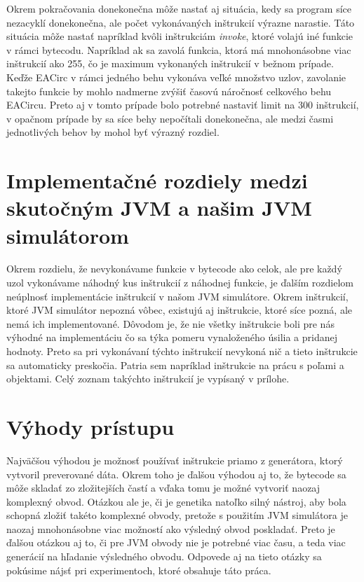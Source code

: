 Okrem pokračovania donekonečna môže nastať aj situácia, kedy sa program síce nezacyklí donekonečna, ale počet vykonávaných inštrukcií výrazne narastie. Táto situácia môže nastať napríklad kvôli inštrukciám \textit{invoke}, ktoré volajú iné funkcie v rámci bytecodu. Napríklad ak sa zavolá funkcia, ktorá má mnohonásobne viac inštrukcií ako 255, čo je maximum vykonaných inštrukcií v bežnom prípade. Keďže EACirc v rámci jedného behu vykonáva veľké množstvo uzlov, zavolanie takejto funkcie by mohlo nadmerne zvýšiť časovú náročnosť celkového behu EACircu. Preto aj v tomto prípade bolo potrebné nastaviť limit na 300 inštrukcií, v opačnom prípade by sa síce behy nepočítali donekonečna, ale medzi časmi jednotlivých behov by mohol byť výrazný rozdiel.

\section{Implementačné rozdiely medzi skutočným JVM a našim JVM simulátorom}
\label{sec:impl-diff}

Okrem rozdielu, že nevykonávame funkcie v bytecode ako celok, ale pre každý uzol vykonávame náhodný kus inštrukcií z náhodnej funkcie, je ďalším rozdielom neúplnosť implementácie inštrukcií v našom JVM simulátore. Okrem inštrukcií, ktoré JVM simulátor nepozná vôbec, existujú aj inštrukcie, ktoré síce pozná, ale nemá ich implementované. Dôvodom je, že nie všetky inštrukcie boli pre nás výhodné na implementáciu čo sa týka pomeru vynaloženého úsilia a pridanej hodnoty. Preto sa pri vykonávaní týchto inštrukcií nevykoná nič a tieto inštrukcie sa automaticky preskočia. Patria sem napríklad inštrukcie na prácu s poľami a objektami. Celý zoznam takýchto inštrukcií je vypísaný v prílohe. 

\section{Výhody prístupu}
\label{sec:advantages}

Najväčšou výhodou je možnosť používať inštrukcie priamo z generátora, ktorý vytvoril preverované dáta. Okrem toho je ďalšou výhodou aj to, že bytecode sa môže skladať zo zložitejších častí a vďaka tomu je možné vytvoriť naozaj komplexný obvod. Otázkou ale je, či je genetika natoľko silný nástroj, aby bola schopná zložiť takéto komplexné obvody, pretože s použitím JVM simulátora je naozaj mnohonásobne viac možností ako výsledný obvod poskladať. Preto je ďalšou otázkou aj to, či pre JVM obvody nie je potrebné viac času, a teda viac generácií na hľadanie výsledného obvodu. Odpovede aj na tieto otázky sa pokúsime nájsť pri experimentoch, ktoré obsahuje táto práca.

